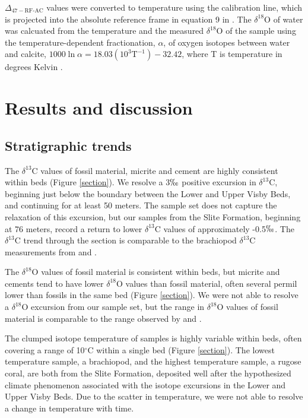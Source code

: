 \documentclass{article}
\newcommand{\deltao}{$\delta^{18}$}
\newcommand{\deltac}{$\delta^{13}$}
\newcommand{\degrees}{$^{\circ}$}
\begin{document}
$\Delta_{47-\text{RF-AC}}$ values were converted to temperature using the \cite{Ghosh2006} calibration line, which is projected into the absolute reference frame in equation 9 in \cite{Dennis2011}. The \deltao O of water was calcuated from the temperature and the measured \deltao O of the sample using the temperature-dependent fractionation, $\alpha$, of oxygen isotopes between water and calcite, $1000\ln\alpha=18.03\left(10^3\text{T}^{-1}\right)-32.42$, where T is temperature in degrees Kelvin \citep{Kim1997}. 

\section{Results and discussion}

\subsection{Stratigraphic trends}

The \deltac C values of fossil material, micrite and cement are highly consistent within beds (Figure \ref{section}). We resolve a 3$\permil$ positive excursion in \deltac C, beginning just below the boundary between the Lower and Upper Visby Beds, and continuing for at least 50 meters. The sample set does not capture the relaxation of this excursion, but our samples from the Slite Formation, beginning at 76 meters, record a return to lower \deltac C values of approximately -0.5$\permil$. The \deltac C trend through the section is comparable to the brachiopod \deltac C measurements from \cite{Bickert1997} and \cite{Munnecke2003}. 

The \deltao O values of fossil material is consistent within beds, but micrite and cements tend to have lower \deltao O values than fossil material, often several permil lower than fossils in the same bed (Figure \ref{section}). We were not able to resolve a \deltao O excursion from our sample set, but the range in \deltao O values of fossil material is comparable to the range observed by \cite{Bickert1997} and \cite{Munnecke2003}. 

The clumped isotope temperature of samples is highly variable within beds, often covering a range of 10\degrees C within a single bed (Figure \ref{section}). The lowest temperature sample, a brachiopod, and the highest temperature sample, a rugose coral, are both from the Slite Formation, deposited well after the hypothesized climate phenomenon associated with the isotope excursions in the Lower and Upper Visby Beds. Due to the scatter in temperature, we were not able to resolve a change in temperature with time. 
\end{document}
